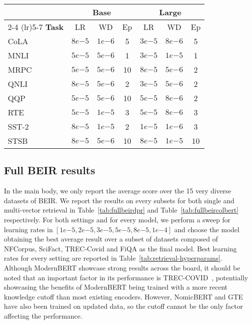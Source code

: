 \documentclass[11pt]{article}
\begin{document}
\begin{table*}[]
\centering
\begin{tabular}{lcccccc}
\toprule
 & \multicolumn{3}{c}{\textbf{Base}} & \multicolumn{3}{c}{\textbf{Large}} \\
 \cmidrule(lr){2-4}  \cmidrule(lr){5-7} 
\textbf{Task} & LR & WD & Ep & LR & WD & Ep \\
\midrule
CoLA & $8e{-5}$ & $1e{-6}$ & 5 & $3e{-5}$ & $8e{-6}$ & 5 \\
MNLI & $5e{-5}$ & $5e{-6}$ & 1 & $3e{-5}$ & $1e{-5}$ & 1 \\
MRPC & $5e{-5}$ & $5e{-6}$ & 10 & $8e{-5}$ & $5e{-6}$ & 2 \\
QNLI & $8e{-5}$ & $5e{-6}$ & 2 & $3e{-5}$ & $5e{-6}$ & 2 \\
QQP & $5e{-5}$ & $5e{-6}$ & 10 & $5e{-5}$ & $8e{-6}$ & 2 \\
RTE & $5e{-5}$ & $1e{-5}$ & 3 & $5e{-5}$ & $8e{-6}$ & 3 \\
SST-2 & $8e{-5}$ & $1e{-5}$ & 2 & $1e{-5}$ & $1e{-6}$ & 3 \\
STSB & $8e{-5}$ & $5e{-6}$ & 10 & $8e{-5}$ & $1e{-5}$ & 10 \\
\bottomrule
\end{tabular}
\caption{Fine-tuning hyperparameters for ModernBERT on GLUE tasks. LR: Learning Rate, WD: Weight Decay, Ep: Epochs.}
\label{tab:glue-hyperparams}
\end{table*}

\subsection{Full BEIR results}
\label{subsec:fullBEIRresults}
In the main body, we only report the average score over the 15 very diverse datasets of BEIR. We report the results on every subsets for both single and multi-vector retrieval in Table~\ref{tab:fullbeirdpr} and Table~\ref{tab:fullbeircolbert} respectively.
For both settings and for every model, we perform a sweep for learning rates in $[1e{-5}, 2e{-5}, 3e{-5}, 5e{-5}, 8e{-5}, 1e{-4}]$ and choose the model obtaining the best average result over a subset of datasets composed of NFCorpus, SciFact, TREC-Covid and FiQA as the final model. Best learning rates for every setting are reported in Table~\ref{tab:retrieval-hyperparams}. Although ModernBERT showcase strong results across the board, it should be noted that an important factor in its performance is TREC-COVID~\cite{treccovid}, potentially showcasing the benefits of ModernBERT being trained with a more recent knowledge cutoff than most existing encoders. However, NomicBERT and GTE have also been trained on updated data, so the cutoff cannot be the only factor affecting the performance.
\end{document}
